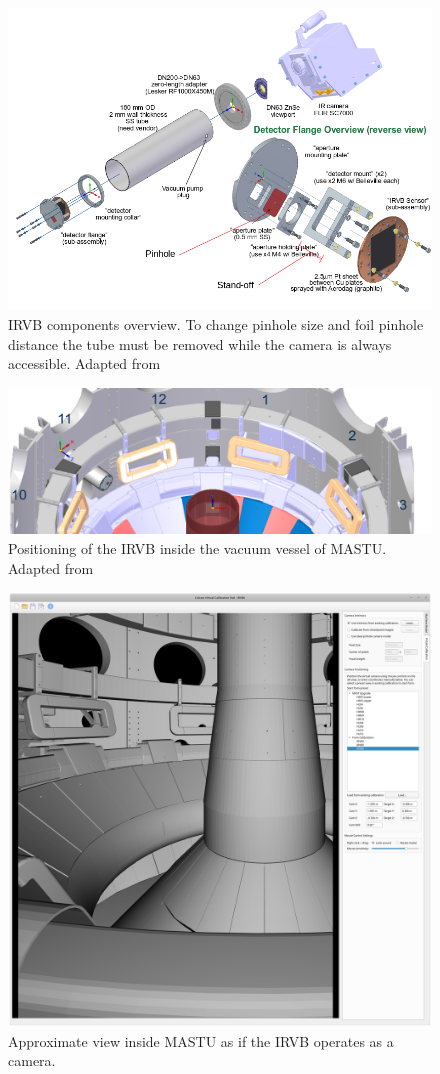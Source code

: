 \begin{figure}
	\centering
	\includegraphics[width=\linewidth]{Chapters/chapter2/figs/IRVB2.png}
	\caption{IRVB components overview. To change pinhole size and foil pinhole distance the tube must be removed while the camera is always accessible. Adapted from \cite{Reinke2017a}}
	\label{fig:IRVB_components}
\end{figure}

\begin{figure}
	\centering
	\includegraphics[width=\linewidth]{Chapters/chapter2/figs/where_irvb.png}
	\caption{Positioning of the IRVB inside the vacuum vessel of MASTU. Adapted from \cite{Reinke2017a}}
	\label{fig:IRVB_location}
\end{figure}

\begin{figure}
	\centering
	\includegraphics[trim={30 10 450 85},clip,width=0.6\linewidth]{Chapters/chapter2/figs/calcam.png}
	\caption{Approximate view inside MASTU as if the IRVB operates as a camera.}
	\label{fig:calcam}
\end{figure}

